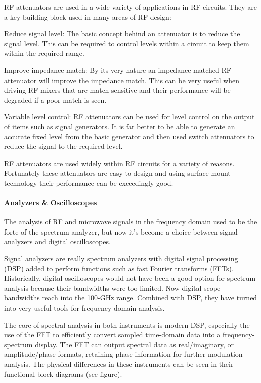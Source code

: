 	RF attenuators are used in a wide variety of applications in RF circuits. They are a key building block used in many areas of RF design:

Reduce signal level:   The basic concept behind an attenuator is to reduce the signal level. This can be required to control levels within a circuit to keep them within the required range.
	
	Improve impedance match:   By its very nature an impedance matched RF attenuator will improve the impedance match. This can be very useful when driving RF mixers that are match sensitive and their performance will be degraded if a poor match is seen.
	
	Variable level control:   RF attenuators can be used for level control on the output of items such as signal generators. It is far better to be able to generate an accurate fixed level from the basic generator and then used switch attenuators to reduce the signal to the required level.

	RF attenuators are used widely within RF circuits for a variety of reasons. Fortunately these attenuators are easy to design and using surface mount technology their performance can be exceedingly good.

\paragraph{Analyzers \& Oscilloscopes}

	The analysis of RF and microwave signals in the frequency domain used to be the forte of the spectrum analyzer, but now it’s become a choice between signal analyzers and digital oscilloscopes. 

	Signal analyzers are really spectrum analyzers with digital signal processing (DSP) added to perform functions such as fast Fourier transforms (FFTs). Historically, digital oscilloscopes would not have been a good option for spectrum analysis because their bandwidths were too limited. Now digital scope bandwidths reach into the 100-GHz range. Combined with DSP, they have turned into very useful tools for frequency-domain analysis.


	The core of spectral analysis in both instruments is modern DSP, especially the use of the FFT to efficiently convert sampled time-domain data into a frequency-spectrum display. The FFT can output spectral data as real/imaginary, or amplitude/phase formats, retaining phase information for further modulation analysis. The physical differences in these instruments can be seen in their functional block diagrams (see figure).


